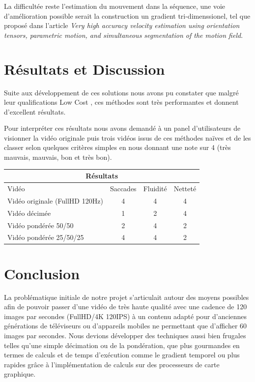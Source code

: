 \documentclass[fleqn,10pt]{SelfArx} %
\begin{document}
La difficultée reste l'estimation du mouvement dans la séquence,
une voie d'amélioration possible serait la construction un gradient tri-dimenssionel, 
tel que proposé dans l'article {\em Very high accuracy velocity estimation using orientation tensors, parametric motion, and simultaneous segmentation of the motion field}\cite{farneback2001}.

\section{Résultats et Discussion}
Suite aux développement de ces solutions nous avons pu constater que malgré leur qualifications \og Low Cost \fg{}, ces méthodes sont très performantes et donnent d'excellent résultats.

Pour interpréter ces résultats nous avons demandé à un panel d'utilisateurs de visionner la vidéo originale puis trois vidéos issus de ces méthodes naïves et de les classer selon quelques critères simples en nous donnant une note sur 4 (très mauvais, mauvais, bon et très bon).
\begin{center}

\begin{tabular}{|p{3cm}||c|c|c|}
  \hline
  \multicolumn{4}{|c|}{Résultats} \\
  \hline
  Vidéo & Saccades & Fluidité & Netteté\\ \hline
  Vidéo originale (FullHD 120Hz) & 4 & 4 & 4 \\ \hline
  Vidéo décimée & 1 & 2 & 4 \\ \hline
  Vidéo pondérée 50/50 & 2 & 4 & 2 \\ \hline
  Vidéo pondérée 25/50/25 & 4 & 4 & 2 \\ \hline
\end{tabular}

\end{center}


\section{Conclusion}
La problématique initiale de notre projet s'articulait autour des moyens possibles afin de pouvoir passer d'une vidéo de très haute qualité avec une cadence de 120 images par secondes (FullHD/4K 120IPS) à un contenu adapté pour d'anciennes générations de téléviseurs ou d'appareils mobiles ne permettant que d'afficher 60 images par secondes.
Nous devions développer des techniques aussi bien frugales telles qu'une simple décimation ou de la pondération, que plus gourmandes en termes de calculs et de temps d'exécution comme le gradient temporel ou plus rapides grâce à l'implémentation de calculs sur des processeurs de carte graphique.
\end{document}
